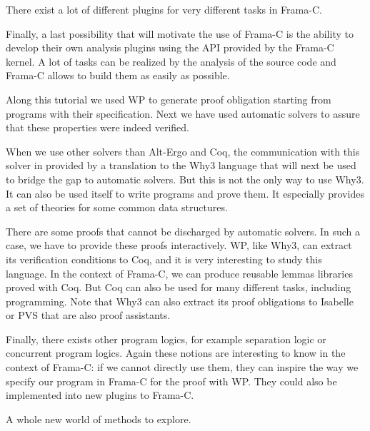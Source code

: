 There exist a lot of different plugins for very different tasks in Frama-C.

Finally, a last possibility that will motivate the use of Frama-C is the
ability to develop their own analysis plugins using the API provided by
the Frama-C kernel. A lot of tasks can be realized by the analysis of
the source code and Frama-C allows to build them as easily as possible.




Along this tutorial we used WP to generate proof obligation starting
from programs with their specification. Next we have used automatic
solvers to assure that these properties were indeed verified.

When we use other solvers than Alt-Ergo and Coq, the communication with
this solver in provided by a translation to the Why3 language that will
next be used to bridge the gap to automatic solvers. But this is not the
only way to use Why3. It can also be used itself to write programs and
prove them. It especially provides a set of theories for some common
data structures.

There are some proofs that cannot be discharged by automatic solvers. In
such a case, we have to provide these proofs interactively. WP, like
Why3, can extract its verification conditions to Coq, and it is very
interesting to study
this language. In the context of Frama-C, we can produce reusable lemmas
libraries proved with Coq. But Coq can also be used for many
different tasks, including programming. Note that Why3 can also extract
its proof obligations to Isabelle or PVS that are also proof assistants.

Finally, there exists other program logics, for example separation logic
or concurrent program logics. Again these notions are interesting to know
in the context of Frama-C: if we cannot directly use them, they can
inspire the way we specify our program in Frama-C for the proof with WP.
They could also be implemented into new plugins to Frama-C.

A whole new world of methods to explore.
